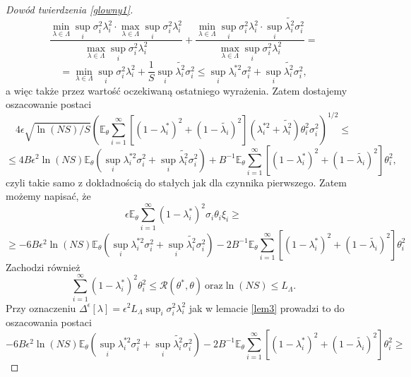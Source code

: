 \documentclass{mwart}
\begin{document}
\begin{proof}[Dowód twierdzenia \ref{glowny1}]
\begin{displaymath}
\frac{\min_{\lambda\in\Lambda}\sup_i\sigma_i^2\lambda_i^2\cdot \max_{\lambda\in\Lambda}\sup_i\sigma_i^2\lambda_i^2}{\max_{\lambda\in\Lambda}\sup_i\sigma_i^2\lambda_i^2}+\frac{\min_{\lambda\in\Lambda}\sup_i\sigma_i^2\lambda_i^2\cdot \sup_i\tilde{\lambda_i^2}\sigma_i^2}{\max_{\lambda\in\Lambda}\sup_i\sigma_i^2\lambda_i^2}=
\end{displaymath}
\begin{displaymath}
=\min_{\lambda\in\Lambda}\sup_i\sigma_i^2\lambda_i^2+\frac{1}{S}\sup_i\tilde{\lambda_i^2}\sigma_i^2\leq\sup_i\lambda_i^{*2}\sigma_i^2+\sup_i\tilde{\lambda_i^2}\sigma_i^2,
\end{displaymath}
a więc także przez wartość oczekiwaną ostatniego wyrażenia. Zatem dostajemy oszacowanie postaci
\begin{displaymath}
4\epsilon\sqrt{\ln (NS)/S}\left(\mathbb{E}_{\theta}\sum_{i=1}^{\infty}[(1-\lambda_i^*)^2+(1-\tilde{\lambda_i})^2](\lambda_i^{*2}+\tilde{\lambda_i^2})\theta_i^2\sigma_i^2\right)^{1/2}\leq
\end{displaymath}
\begin{displaymath}
\leq 4B\epsilon^2 \ln (NS)\mathbb{E}_{\theta}\left(\sup_i\lambda_i^{*2}\sigma_i^2+\sup_i\tilde{\lambda_i^2}\sigma_i^2\right)+B^{-1}\mathbb{E}_{\theta}\sum_{i=1}^{\infty}[(1-\lambda_i^*)^2+(1-\tilde{\lambda_i})^2]\theta_i^2,
\end{displaymath}
czyli takie samo z dokładnością do stałych jak dla czynnika pierwszego. Zatem możemy napisać, że 
\begin{displaymath}
\epsilon\mathbb{E}_{\theta}\sum_{i=1}^{\infty}(1-\lambda_i^*)^2\sigma_i\theta_i\xi_i\geq 
\end{displaymath}
\begin{displaymath}
\geq -6B\epsilon^2 \ln (NS)\mathbb{E}_{\theta}\left(\sup_i\lambda_i^{*2}\sigma_i^2+\sup_i\tilde{\lambda_i^2}\sigma_i^2\right)-2B^{-1}\mathbb{E}_{\theta}\sum_{i=1}^{\infty}[(1-\lambda_i^*)^2+(1-\tilde{\lambda_i})^2]\theta_i^2
\end{displaymath}
Zachodzi również
\begin{displaymath}
\sum_{i=1}^{\infty}(1-\lambda_i^{*})^2\theta_i^2\leq \mathcal{R}(\theta^*,\theta)\ \textrm{oraz} \ln (NS)\leq L_{\Lambda}.
\end{displaymath}
Przy oznaczeniu $\Delta^{\epsilon}[\lambda]=\epsilon^2L_{\Lambda}\sup_i\sigma_i^2\lambda_i^2$ jak w lemacie \ref{lem3} prowadzi to do oszacowania postaci
\begin{displaymath}
-6B\epsilon^2 \ln (NS)\mathbb{E}_{\theta}\left(\sup_i\lambda_i^{*2}\sigma_i^2+\sup_i\tilde{\lambda_i^2}\sigma_i^2\right)-2B^{-1}\mathbb{E}_{\theta}\sum_{i=1}^{\infty}[(1-\lambda_i^*)^2+(1-\tilde{\lambda_i})^2]\theta_i^2\geq

\end{displaymath}
\end{proof}
\end{document}

